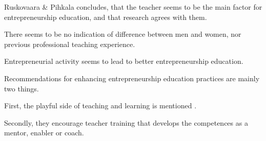 Ruskovaara \& Pihkala \citep{ruskovaara} concludes, that the teacher seems to be the main factor for entrepreneurship education, and that research agrees with them.

There seems to be no indication of difference between men and women, nor previous professional teaching experience.

Entrepreneurial activity seems to lead to better entrepreneurship education.

Recommendations for enhancing entrepreneurship education practices are mainly two things.

First, the playful side of teaching and learning is mentioned \citep{dickson}.

Secondly, they encourage teacher training that develops the competences as a mentor, enabler or coach.
